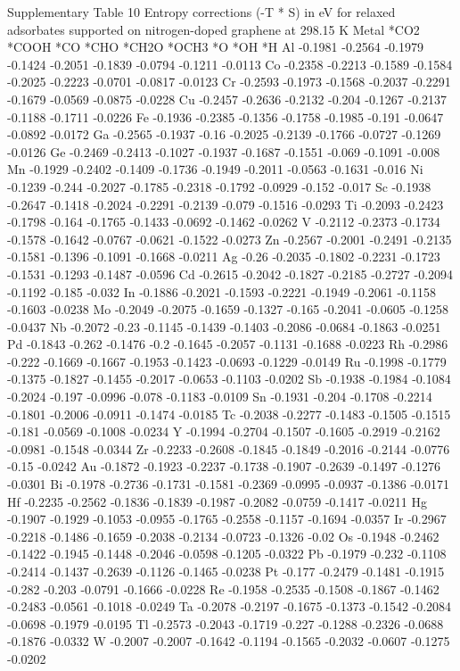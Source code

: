 Supplementary Table 10
Entropy corrections (-T * S) in eV for relaxed adsorbates supported on nitrogen-doped graphene at 298.15 K
Metal	*CO2	*COOH	*CO	*CHO	*CH2O	*OCH3	*O	*OH	*H
Al	-0.1981	-0.2564	-0.1979	-0.1424	-0.2051	-0.1839	-0.0794	-0.1211	-0.0113
Co	-0.2358	-0.2213	-0.1589	-0.1584	-0.2025	-0.2223	-0.0701	-0.0817	-0.0123
Cr	-0.2593	-0.1973	-0.1568	-0.2037	-0.2291	-0.1679	-0.0569	-0.0875	-0.0228
Cu	-0.2457	-0.2636	-0.2132	-0.204	-0.1267	-0.2137	-0.1188	-0.1711	-0.0226
Fe	-0.1936	-0.2385	-0.1356	-0.1758	-0.1985	-0.191	-0.0647	-0.0892	-0.0172
Ga	-0.2565	-0.1937	-0.16	-0.2025	-0.2139	-0.1766	-0.0727	-0.1269	-0.0126
Ge	-0.2469	-0.2413	-0.1027	-0.1937	-0.1687	-0.1551	-0.069	-0.1091	-0.008
Mn	-0.1929	-0.2402	-0.1409	-0.1736	-0.1949	-0.2011	-0.0563	-0.1631	-0.016
Ni	-0.1239	-0.244	-0.2027	-0.1785	-0.2318	-0.1792	-0.0929	-0.152	-0.017
Sc	-0.1938	-0.2647	-0.1418	-0.2024	-0.2291	-0.2139	-0.079	-0.1516	-0.0293
Ti	-0.2093	-0.2423	-0.1798	-0.164	-0.1765	-0.1433	-0.0692	-0.1462	-0.0262
V	-0.2112	-0.2373	-0.1734	-0.1578	-0.1642	-0.0767	-0.0621	-0.1522	-0.0273
Zn	-0.2567	-0.2001	-0.2491	-0.2135	-0.1581	-0.1396	-0.1091	-0.1668	-0.0211
Ag	-0.26	-0.2035	-0.1802	-0.2231	-0.1723	-0.1531	-0.1293	-0.1487	-0.0596
Cd	-0.2615	-0.2042	-0.1827	-0.2185	-0.2727	-0.2094	-0.1192	-0.185	-0.032
In	-0.1886	-0.2021	-0.1593	-0.2221	-0.1949	-0.2061	-0.1158	-0.1603	-0.0238
Mo	-0.2049	-0.2075	-0.1659	-0.1327	-0.165	-0.2041	-0.0605	-0.1258	-0.0437
Nb	-0.2072	-0.23	-0.1145	-0.1439	-0.1403	-0.2086	-0.0684	-0.1863	-0.0251
Pd	-0.1843	-0.262	-0.1476	-0.2	-0.1645	-0.2057	-0.1131	-0.1688	-0.0223
Rh	-0.2986	-0.222	-0.1669	-0.1667	-0.1953	-0.1423	-0.0693	-0.1229	-0.0149
Ru	-0.1998	-0.1779	-0.1375	-0.1827	-0.1455	-0.2017	-0.0653	-0.1103	-0.0202
Sb	-0.1938	-0.1984	-0.1084	-0.2024	-0.197	-0.0996	-0.078	-0.1183	-0.0109
Sn	-0.1931	-0.204	-0.1708	-0.2214	-0.1801	-0.2006	-0.0911	-0.1474	-0.0185
Tc	-0.2038	-0.2277	-0.1483	-0.1505	-0.1515	-0.181	-0.0569	-0.1008	-0.0234
Y	-0.1994	-0.2704	-0.1507	-0.1605	-0.2919	-0.2162	-0.0981	-0.1548	-0.0344
Zr	-0.2233	-0.2608	-0.1845	-0.1849	-0.2016	-0.2144	-0.0776	-0.15	-0.0242
Au	-0.1872	-0.1923	-0.2237	-0.1738	-0.1907	-0.2639	-0.1497	-0.1276	-0.0301
Bi	-0.1978	-0.2736	-0.1731	-0.1581	-0.2369	-0.0995	-0.0937	-0.1386	-0.0171
Hf	-0.2235	-0.2562	-0.1836	-0.1839	-0.1987	-0.2082	-0.0759	-0.1417	-0.0211
Hg	-0.1907	-0.1929	-0.1053	-0.0955	-0.1765	-0.2558	-0.1157	-0.1694	-0.0357
Ir	-0.2967	-0.2218	-0.1486	-0.1659	-0.2038	-0.2134	-0.0723	-0.1326	-0.02
Os	-0.1948	-0.2462	-0.1422	-0.1945	-0.1448	-0.2046	-0.0598	-0.1205	-0.0322
Pb	-0.1979	-0.232	-0.1108	-0.2414	-0.1437	-0.2639	-0.1126	-0.1465	-0.0238
Pt	-0.177	-0.2479	-0.1481	-0.1915	-0.282	-0.203	-0.0791	-0.1666	-0.0228
Re	-0.1958	-0.2535	-0.1508	-0.1867	-0.1462	-0.2483	-0.0561	-0.1018	-0.0249
Ta	-0.2078	-0.2197	-0.1675	-0.1373	-0.1542	-0.2084	-0.0698	-0.1979	-0.0195
Tl	-0.2573	-0.2043	-0.1719	-0.227	-0.1288	-0.2326	-0.0688	-0.1876	-0.0332
W	-0.2007	-0.2007	-0.1642	-0.1194	-0.1565	-0.2032	-0.0607	-0.1275	-0.0202


